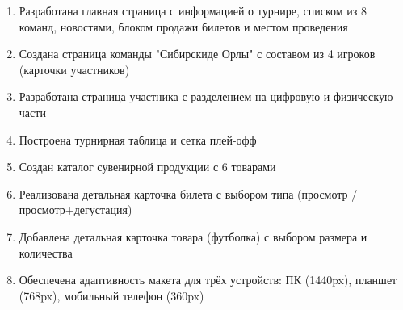 \documentclass[a4paper,14pt,oneside,openany]{memoir}
\begin{document}
\begin{enumerate}
    \item Разработана главная страница с информацией о турнире, списком из 8 команд, новостями, блоком продажи билетов и местом проведения
    \item Создана страница команды "Сибирскиде Орлы" с составом из 4 игроков (карточки участников)
    \item Разработана страница участника с разделением на цифровую и физическую части
    \item Построена турнирная таблица и сетка плей-офф
    \item Создан каталог сувенирной продукции с 6 товарами
    \item Реализована детальная карточка билета с выбором типа (просмотр / просмотр+дегустация)
    \item Добавлена детальная карточка товара (футболка) с выбором размера и количества
    \item Обеспечена адаптивность макета для трёх устройств: ПК (1440px), планшет (768px), мобильный телефон (360px)
\end{enumerate}
\end{document}
